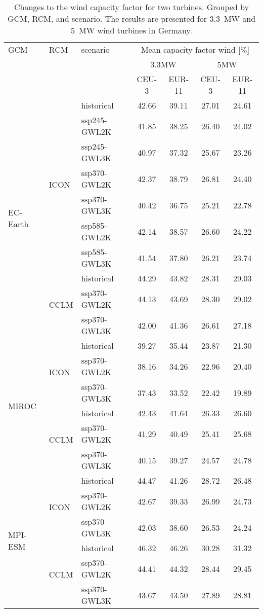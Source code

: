 \begin{table}[!htbp]
\centering
\caption{Changes to the wind capacity factor for two turbines. Grouped by GCM, RCM, and scenario. The results are presented for \qty{3.3}{\mega\watt} and \qty{5}{\mega\watt} wind turbines in Germany.}
\label{Table:CF_Wind_changes}
\begin{tabular}{lll|cc|cc}
\toprule
GCM & RCM & scenario & \multicolumn{4}{c}{Mean capacity factor wind [\%]} \\
 & & & \multicolumn{2}{c}{3.3\si{\mega\watt}} & \multicolumn{2}{c}{5\si{\mega\watt}} \\
 & & & CEU-3 & EUR-11 & CEU-3 & EUR-11 \\
\midrule
\cmidrule(lr){1-7}
\multirow{10}{*}{EC-Earth} & \multirow{7}{*}{ICON} & historical & 42.66 & 39.11 & 27.01 & 24.61 \\
 &  & ssp245-GWL2K & 41.85 & 38.25 & 26.40 & 24.02 \\
 &  & ssp245-GWL3K & 40.97 & 37.32 & 25.67 & 23.26 \\
 &  & ssp370-GWL2K & 42.37 & 38.79 & 26.81 & 24.40 \\
 &  & ssp370-GWL3K & 40.42 & 36.75 & 25.21 & 22.78 \\
 &  & ssp585-GWL2K & 42.14 & 38.57 & 26.60 & 24.22 \\
 &  & ssp585-GWL3K & 41.54 & 37.80 & 26.21 & 23.74 \\
\cmidrule(lr){2-7}
 & \multirow{3}{*}{CCLM} & historical & 44.29 & 43.82 & 28.31 & 29.03 \\
 &  & ssp370-GWL2K & 44.13 & 43.69 & 28.30 & 29.02 \\
 &  & ssp370-GWL3K & 42.00 & 41.36 & 26.61 & 27.18 \\
\cmidrule(lr){2-7}
\multirow{6}{*}{MIROC} & \multirow{3}{*}{ICON} & historical & 39.27 & 35.44 & 23.87 & 21.30 \\
 &  & ssp370-GWL2K & 38.16 & 34.26 & 22.96 & 20.40 \\
 &  & ssp370-GWL3K & 37.43 & 33.52 & 22.42 & 19.89 \\
\cmidrule(lr){2-7}
 & \multirow{3}{*}{CCLM} & historical & 42.43 & 41.64 & 26.33 & 26.60 \\
 &  & ssp370-GWL2K & 41.29 & 40.49 & 25.41 & 25.68 \\
 &  & ssp370-GWL3K & 40.15 & 39.27 & 24.57 & 24.78 \\
\cmidrule(lr){2-7}
\multirow{6}{*}{MPI-ESM} & \multirow{3}{*}{ICON} & historical & 44.47 & 41.26 & 28.72 & 26.48 \\
 &  & ssp370-GWL2K & 42.67 & 39.33 & 26.99 & 24.73 \\
 &  & ssp370-GWL3K & 42.03 & 38.60 & 26.53 & 24.24 \\
\cmidrule(lr){2-7}
 & \multirow{3}{*}{CCLM} & historical & 46.32 & 46.26 & 30.28 & 31.32 \\
 &  & ssp370-GWL2K & 44.41 & 44.32 & 28.44 & 29.45 \\
 &  & ssp370-GWL3K & 43.67 & 43.50 & 27.89 & 28.81 \\
\bottomrule
\end{tabular}
\end{table}
